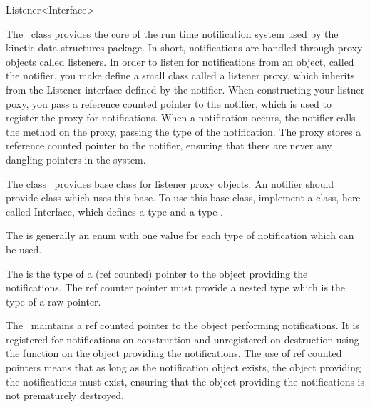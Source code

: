 

\begin{ccRefClass}{Listener<Interface>}  %


\ccDefinition
 
The \ccRefName\ class provides the core of the run time notification
system used by the kinetic data structures package. In short,
notifications are handled through proxy objects called listeners. In order to listen for notifications from an object, called the notifier, you make define a small class called a listener proxy, which inherits from the Listener interface defined by the notifier. When constructing your listner poxy, you pass a reference counted pointer to the notifier, which is used to register the proxy for notifications. When a notification occurs, the notifier calls the  method on the proxy, passing the type of the notification. The proxy stores a reference counted pointer to the notifier, ensuring that there are never any dangling pointers in the system. 

The class \ccRefName\ provides base class for listener proxy objects. An notifier should provide class which
uses this base. To use this base class, implement a class, here called
Interface, which defines a type  and a
type .

  The  is generally an enum with one value for each
  type of notification which can be used.

  The  is the type of a (ref counted) pointer to the
  object providing the notifications. The ref counter pointer must
  provide a nested type  which is the type of a raw pointer.

  The \ccRefName\ maintains a ref counted pointer to the object performing
  notifications. It is registered for notifications on construction
  and unregistered on destruction using the function  on
  the object providing the notifications. The use of ref counted
  pointers means that as long as the notification object exists, the
  object providing the notifications must exist, ensuring that the
  object providing the notifications is not prematurely destroyed.


\end{ccRefClass}
